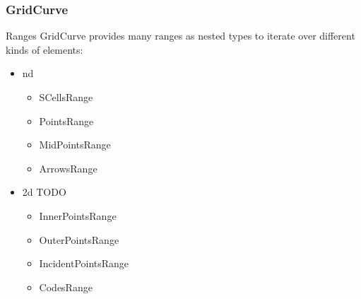 \begin{frame}
  \frametitle{GridCurve}

  \begin{block}{Ranges}
GridCurve provides many ranges as nested types to iterate over different kinds of elements:
\begin{itemize}
 \item nd
  \begin{itemize}
   \item<1-2> SCellsRange
   \item<3> PointsRange
   \item<4> MidPointsRange
   \item<5> ArrowsRange
  \end{itemize}
 \item 2d TODO
  \begin{itemize}
   \item<6> InnerPointsRange
   \item<7> OuterPointsRange
   \item<8> IncidentPointsRange
   \item CodesRange
  \end{itemize}
\end{itemize}
  \end{block}

\end{frame}

